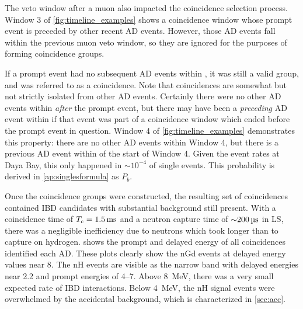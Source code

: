 The veto window after a muon also impacted the coincidence selection process.
Window 3 of \cref{fig:timeline_examples} shows a coincidence window
whose prompt event is preceded by other recent AD events.
However, those AD events fall within the previous muon veto window,
so they are ignored for the purposes of forming coincidence groups.

If a prompt event had no subsequent AD events within \tc, it was
still a valid group, and was referred to as a  coincidence.
Note that  coincidences are somewhat but not strictly isolated
from other AD events.
Certainly there were no other AD events
within \tc{} \textit{after} the prompt event,
but there may have been a \textit{preceding} AD event within \tc{}
if that event was part of a coincidence window
which ended before the prompt event in question.
Window 4 of \cref{fig:timeline_examples} demonstrates this property:
there are no other AD events within Window 4,
but there is a previous AD event within \tc{} of the start of Window 4.
Given the event rates at Daya Bay, this only happened in ${\sim}10^{-4}$
of single events.
This probability is derived in \cref{ap:singlesformula} as $P_b$.



Once the coincidence groups were constructed,
the resulting set of  coincidences
contained IBD candidates
with substantial background still present.
With a coincidence time of $\tc=\SI{1.5}{\ms}$
and a neutron capture time of $\SI{\sim200}{\us}$ in LS,
there was a negligible inefficiency due to neutrons
which took longer than \tc{} to capture on hydrogen.
 shows the prompt and delayed energy
of all  coincidences identified each AD.
These plots clearly show the nGd events
at delayed energy values near \SI{8}{\mev}.
The nH events are visible as the narrow band with
delayed energies near \SI{2.2}{\mev}
and prompt energies of \SIrange{4}{7}{\mev}.
Above \SI{8}{\MeV}, there was a very small expected rate of IBD interactions.
Below \SI{4}{\MeV},
the nH signal events were overwhelmed by the accidental background,
which is characterized in \cref{sec:acc}.

